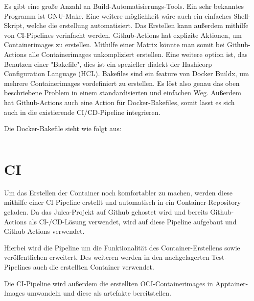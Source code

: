 Es gibt eine große Anzahl an Build-Automatisierungs-Tools. Ein sehr bekanntes Programm ist GNU-Make. Eine weitere möglichkeit wäre auch ein einfaches Shell-Skript, welche die erstellung automatisiert. Das Erstellen kann außerdem mithilfe von CI-Pipelines verinfacht werden. Github-Actions hat explizite Aktionen, um Containerimages zu erstellen. Mithilfe einer Matrix könnte man somit bei Github-Actions alle Containerimages unkompliziert erstellen. Eine weitere option ist, das Benutzen einer "Bakefile", dies ist ein spezieller dialekt der Hashicorp Configuration Language (HCL). Bakefiles sind ein feature von Docker Buildx, um mehrere Containerimages vordefiniert zu erstellen. Es löst also genau das oben beschriebene Problem in einem standardisierten und einfachen Weg. Außerdem hat Github-Actions auch eine Action für Docker-Bakefiles, somit lässt es sich auch in die existierende CI/CD-Pipeline integrieren. 

Die Docker-Bakefile sieht wie folgt aus: 

\inputminted{dockerfile}{./code-examples/docker-bake.hcl}

\section{CI}

Um das Erstellen der Container noch komfortabler zu machen, werden diese mithilfe einer CI-Pipeline erstellt und automatisch in ein Container-Repository geladen. Da das Julea-Projekt auf Github gehostet wird und bereits Github-Actions als CI-/CD-Lösung verwendet, wird auf diese Pipeline aufgebaut und Github-Actions verwendet.

Hierbei wird die Pipeline um die Funktionalität des Container-Erstellens sowie veröffentlichen erweitert. Des weiteren werden in den nachgelagerten Test-Pipelines auch die erstellten Container verwendet.

Die CI-Pipeline wird außerdem die erstellten OCI-Containerimages in Apptainer-Images umwandeln und diese als artefakte bereitstellen.


